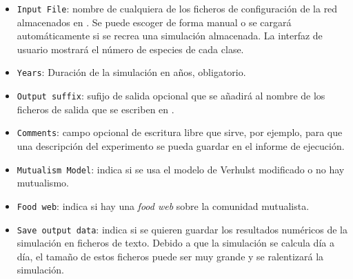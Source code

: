 \begin{itemize}
\item \texttt{Input File}: nombre de cualquiera de los ficheros de configuración de la red almacenados en . Se puede escoger de forma manual o se cargará automáticamente si se recrea una simulación almacenada. La interfaz de usuario mostrará el número de especies de cada clase.

\item \texttt{Years}:  Duración de la simulación en años, obligatorio.

\item \texttt{Output suffix}: sufijo de salida opcional que se añadirá al nombre de los ficheros de salida que se escriben en  .

\item \texttt{Comments}: campo opcional de escritura libre que sirve, por ejemplo, para que una descripción del experimento se pueda guardar en el informe de ejecución.

\item \texttt{Mutualism Model}: indica si se usa el modelo de Verhulst modificado o no hay mutualismo.

\item \texttt{Food web}: indica si hay una \textit{food web} sobre la comunidad mutualista.

\item \texttt{Save output data}: indica si se quieren guardar los resultados numéricos de la simulación en ficheros de texto. Debido a que la simulación se calcula día a día, el tamaño de estos ficheros puede ser muy grande y se ralentizará la simulación.

\end{itemize}

